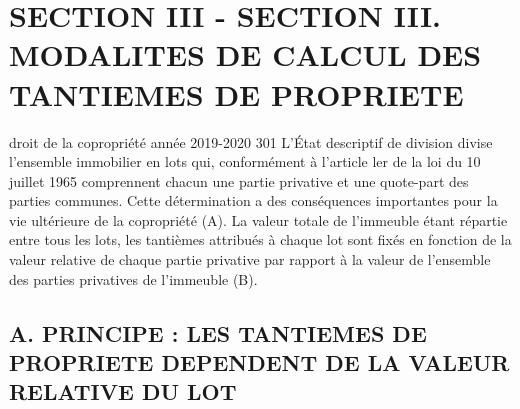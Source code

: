 \section{SECTION III - SECTION III. MODALITES DE CALCUL DES TANTIEMES DE PROPRIETE}
	
	droit de la copropriété année 2019-2020
	301
	L'État descriptif de division divise l'ensemble immobilier en lots qui, conformément à l'article ler de la loi du 10 juillet 1965 comprennent chacun une partie privative et une quote-part des parties communes. Cette détermination a des conséquences importantes pour la vie ultérieure de la copropriété (A).
	La valeur totale de l'immeuble étant répartie entre tous les lots, les tantièmes attribués à chaque lot sont fixés en fonction de la valeur relative de chaque partie privative par rapport à la valeur de l’ensemble des parties privatives de l’immeuble (B).
	
	\subsection{A. PRINCIPE : LES TANTIEMES DE PROPRIETE DEPENDENT DE LA VALEUR RELATIVE DU LOT}
	
